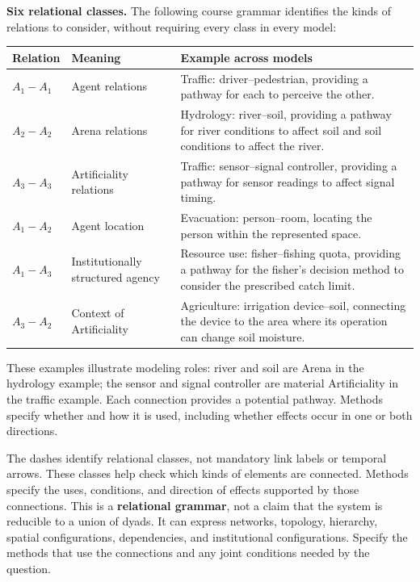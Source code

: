 \documentclass[11pt,a4paper]{article}
\begin{document}
\textbf{Six relational classes.} The following course grammar identifies the kinds of relations to consider, without requiring every class in every model:

\begin{center}
\renewcommand{\arraystretch}{1.2}
\begin{tabularx}{\linewidth}{@{}P{1.7cm}P{4cm}Y@{}}
\toprule
\textbf{Relation} & \textbf{Meaning} & \textbf{Example across models}\\
\midrule
$A_1-A_1$ & Agent relations & Traffic: driver--pedestrian, providing a pathway for each to perceive the other.\\
$A_2-A_2$ & Arena relations & Hydrology: river--soil, providing a pathway for river conditions to affect soil and soil conditions to affect the river.\\
$A_3-A_3$ & Artificiality relations & Traffic: sensor--signal controller, providing a pathway for sensor readings to affect signal timing.\\
$A_1-A_2$ & Agent location & Evacuation: person--room, locating the person within the represented space.\\
$A_1-A_3$ & Institutionally structured agency & Resource use: fisher--fishing quota, providing a pathway for the fisher's decision method to consider the prescribed catch limit.\\
$A_3-A_2$ & Context of Artificiality & Agriculture: irrigation device--soil, connecting the device to the area where its operation can change soil moisture.\\
\bottomrule
\end{tabularx}
\end{center}

These examples illustrate modeling roles: river and soil are Arena in the hydrology example; the sensor and signal controller are material Artificiality in the traffic example. Each connection provides a potential pathway. Methods specify whether and how it is used, including whether effects occur in one or both directions.

The dashes identify relational classes, not mandatory link labels or temporal arrows. These classes help check which kinds of elements are connected. Methods specify the uses, conditions, and direction of effects supported by those connections. This is a \textbf{relational grammar}, not a claim that the system is reducible to a union of dyads. It can express networks, topology, hierarchy, spatial configurations, dependencies, and institutional configurations. Specify the methods that use the connections and any joint conditions needed by the question.
\end{document}
